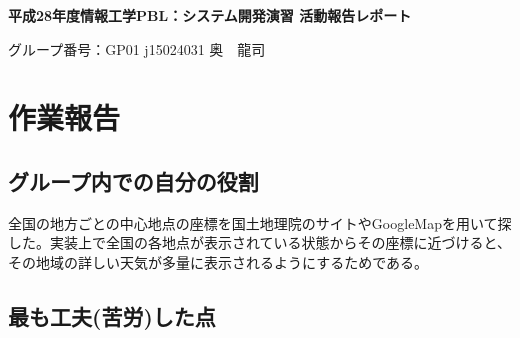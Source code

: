 \documentclass[a4j]{jarticle}
\begin{document}
\pagestyle{empty}
\begin{center}
{\Large\bf 平成28年度情報工学PBL：システム開発演習 活動報告レポート}\par
\vspace*{5mm}




{\large グループ番号：GP01\hspace*{1em} %
{j15024031 奥　龍司}
}\\
\end{center}

\section{作業報告}

\subsection{グループ内での自分の役割}

全国の地方ごとの中心地点の座標を国土地理院のサイトやGoogleMapを用いて探した。実装上で全国の各地点が表示されている状態からその座標に近づけると、その地域の詳しい天気が多量に表示されるようにするためである。



\subsection{最も工夫(苦労)した点}
\end{document}
